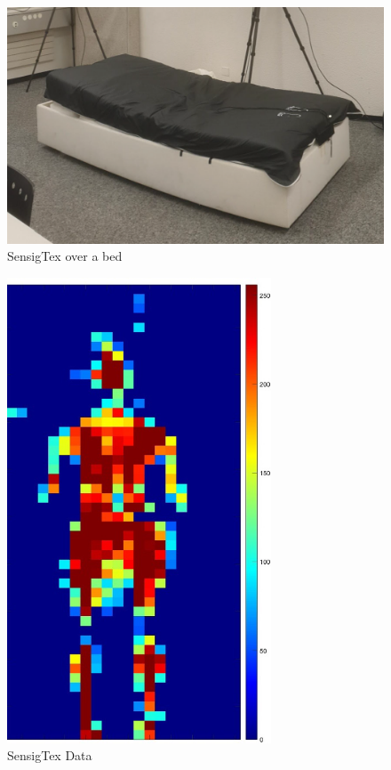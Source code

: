 \vspace*{0.5cm}
\begin{figure}[H]
    \centering
    \includegraphics[width=\textwidth]{img/sensingTex.png}
    \caption{SensigTex over a bed}
    \label{fig:sensingtex}
\end{figure}

\begin{figure}[p]
    \centering
    \includegraphics[width=0.7\textwidth]{img/sensingtex_2.jpg}
    \caption{SensigTex Data}
    \label{fig:sensingtexData}
\end{figure}

